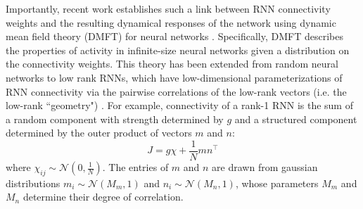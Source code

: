 \documentclass[11pt]{article}
\begin{document}
Importantly, recent work establishes such a link between RNN connectivity weights and the resulting dynamical responses of the network using dynamic mean field theory (DMFT)  for neural networks \cite{sompolinsky1988chaos}.
Specifically, DMFT describes the properties of activity in infinite-size neural networks given a distribution on the connectivity weights.
This theory has been extended from random neural networks to low rank RNNs, which have low-dimensional parameterizations of RNN connectivity via the pairwise correlations of the low-rank vectors (i.e. the low-rank ``geometry")  \cite{mastrogiuseppe2018linking}.  
For example, connectivity of a rank-1 RNN is the sum of a random component with strength determined by $g$ and a structured component determined by the outer product of vectors $m$ and $n$:
\begin{equation}
J = g\chi + \frac{1}{N}mn^\top
\end{equation}
where $\chi_{ij} \sim \mathcal{N}(0, \frac{1}{N})$.  
The entries of $m$ and $n$ are drawn from gaussian distributions $m_i \sim \mathcal{N}(M_m, 1)$ and $n_i \sim \mathcal{N}(M_n, 1)$, whose parameters $M_m$ and $M_n$ determine their degree of correlation.  
\end{document}
